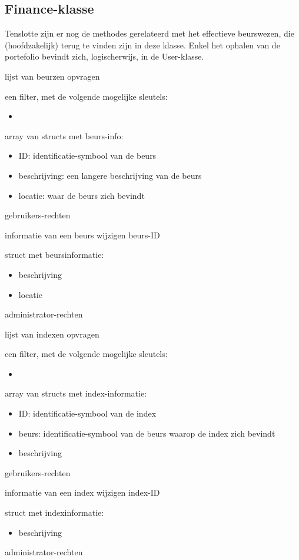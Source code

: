 \subsection{Finance-klasse}

Tenslotte zijn er nog de methodes gerelateerd met het effectieve beurswezen, die (hoofdzakelijk) terug te vinden zijn in deze klasse. Enkel het ophalen van de portefolio bevindt zich, logischerwijs, in de User-klasse.

	{ lijst van beurzen opvragen }
	{ een filter, met de volgende mogelijke sleutels:
		\begin{itemize}
		\item{}
		\end{itemize} }
	{ array van structs met beurs-info:
		\begin{itemize}
		\item{ID: identificatie-symbool van de beurs}
		\item{beschrijving: een langere beschrijving van de beurs}
		\item{locatie: waar de beurs zich bevindt}
		\end{itemize} }
	{ gebruikers-rechten }

	{ informatie van een beurs wijzigen }
	{ beurs-ID }
	{ struct met beursinformatie:
		\begin{itemize}
		\item{beschrijving}
		\item{locatie}
		\end{itemize} }
	{ administrator-rechten }

	{ lijst van indexen opvragen }
	{ een filter, met de volgende mogelijke sleutels:
		\begin{itemize}
		\item{}
		\end{itemize} }
	{ array van structs met index-informatie:
		\begin{itemize}
		\item{ID: identificatie-symbool van de index}
		\item{beurs: identificatie-symbool van de beurs waarop de index zich bevindt}
		\item{beschrijving}
		\end{itemize} }
	{ gebruikers-rechten }

	{ informatie van een index wijzigen }
	{ index-ID }
	{ struct met indexinformatie:
		\begin{itemize}
		\item{beschrijving}
		\end{itemize} }
	{ administrator-rechten }

